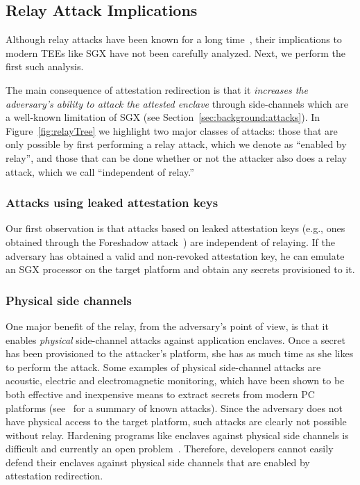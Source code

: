             
\subsection{Relay Attack Implications}
\label{sec:problemStatement:implication}

Although relay attacks have been known for a long time~\cite{parno2008bootstrapping}, their implications to modern TEEs like SGX have not been carefully analyzed. Next, we perform the first such analysis.

The main consequence of attestation redirection is that it \emph{increases the adversary's ability to attack the attested enclave} through side-channels which are a well-known limitation of SGX (see Section~\ref{sec:background:attacks}). In Figure~\ref{fig:relayTree} we highlight two major classes of attacks: those that are only possible by first performing a relay attack, which we denote as ``enabled by relay'', and those that can be done whether or not the attacker also does a relay attack, which we call ``independent of relay.''


\subsubsection{Attacks using leaked attestation keys} Our first observation is that attacks based on leaked attestation keys (e.g., ones obtained through the Foreshadow attack~\cite{foreshadow-usenix18}) are independent of relaying. If the adversary has obtained a valid and non-revoked attestation key, he can emulate an SGX processor on the target platform and obtain any secrets provisioned to it.


\subsubsection{Physical side channels} One major benefit of the relay, from the adversary's point of view, is that it enables \emph{physical} side-channel attacks against application enclaves. Once a secret has been provisioned to the attacker's platform, she has as much time as she likes to perform the attack. Some examples of physical side-channel attacks are acoustic, electric and electromagnetic monitoring, which have been shown to be both effective and inexpensive means to extract secrets from modern PC platforms (see~\cite{genkin2016physical} for a summary of known attacks). Since the adversary does not have physical access to the target platform, such attacks are clearly not possible without relay. Hardening programs like enclaves against physical side channels is difficult and currently an open problem~\cite{genkin2016physical}. Therefore, developers cannot easily defend their enclaves against physical side channels that are enabled by attestation redirection.


